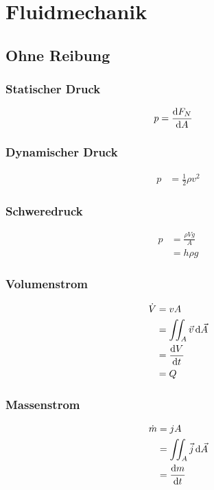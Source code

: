 \section{Fluidmechanik}

\subsection{Ohne Reibung}

\begin{multicols}{2}{}
\subsubsection{Statischer Druck}
\begin{align*}
p&=\frac{\mathop{}\!\mathrm{d} F_N}{\mathop{}\!\mathrm{d} A}
\end{align*}


\subsubsection{Dynamischer Druck}
\begin{align*}
p&=\frac{1}{2}\rho v^2
\end{align*}


\subsubsection{Schweredruck}
\begin{align*}
p&=\frac{\rho V g}{A}\\
&=h\rho g
\end{align*}


\subsubsection{Volumenstrom}
\begin{align*}
\dot{V}&=v A\\
&=\iint_A \vec{v} \mathop{}\!\mathrm{d}\vec{ A}\\
&=\frac{\mathop{}\!\mathrm{d} V}{\mathop{}\!\mathrm{d} t}\\
&=Q
\end{align*}


\subsubsection{Massenstrom}
\begin{align*}
\dot{m}&=jA\\
&=\iint_A \vec{j} \mathop{}\!\mathrm{d}\vec{A}\\
&=\frac{\mathop{}\!\mathrm{d} m}{\mathop{}\!\mathrm{d} t}
\end{align*}


\end{multicols}
